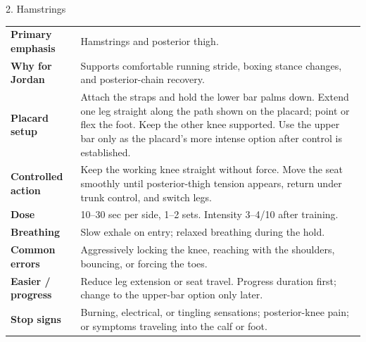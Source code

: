 \documentclass[10pt,letterpaper]{article}
\begin{document}
\begin{stretchbox}{2. Hamstrings}
\begin{tabularx}{\textwidth}{@{}L{1.28in}Y@{}}
\textbf{Primary emphasis} & Hamstrings and posterior thigh. \\
\textbf{Why for Jordan} & Supports comfortable running stride, boxing stance changes, and posterior-chain recovery. \\
\textbf{Placard setup} & Attach the straps and hold the lower bar palms down. Extend one leg straight along the path shown on the placard; point or flex the foot. Keep the other knee supported. Use the upper bar only as the placard's more intense option after control is established. \\
\textbf{Controlled action} & Keep the working knee straight without force. Move the seat smoothly until posterior-thigh tension appears, return under trunk control, and switch legs. \\
\textbf{Dose} & 10--30 sec per side, 1--2 sets. Intensity 3--4/10 after training. \\
\textbf{Breathing} & Slow exhale on entry; relaxed breathing during the hold. \\
\textbf{Common errors} & Aggressively locking the knee, reaching with the shoulders, bouncing, or forcing the toes. \\
\textbf{Easier / progress} & Reduce leg extension or seat travel. Progress duration first; change to the upper-bar option only later. \\
\textbf{Stop signs} & Burning, electrical, or tingling sensations; posterior-knee pain; or symptoms traveling into the calf or foot. \\
\end{tabularx}
\end{stretchbox}
\end{document}
